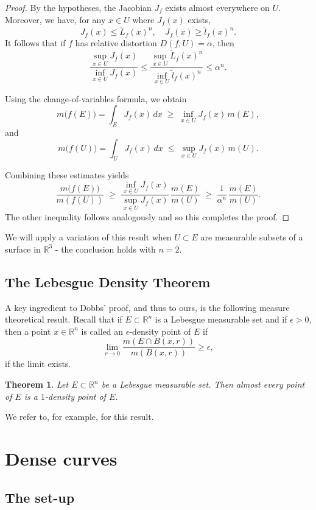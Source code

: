 \documentclass[11pt]{amsart}
\newtheorem{theorem}{Theorem}[section]
\numberwithin{equation}{section}
\theoremstyle{definition}
\theoremstyle{definition}
\theoremstyle{definition}
\newcommand{\R}{\mathbb{R}}
\begin{document}
\begin{proof}
By the hypotheses, the
Jacobian \(J_f\) exists almost everywhere on \(U\).
Moreover, we have, for any $x\in U$ where $J_f(x)$ exists,
\[ J_f(x) \leq \widetilde{L}_f (x) ^n, \quad J_f(x) \geq \widetilde{l}_f(x)^n.\]
It follows that if $f$ has relative distortion $D(f,U) = \alpha$, then
\[
\frac{\sup_{x\in U} J_f(x)}{\inf_{x\in U} J_f(x)} \le \frac{\sup_{x\in U} \widetilde{L}_f(x)^n}{\inf_{x\in U} \widetilde{l}_f(x)^n} \leq \alpha^n .
\]


Using the change-of-variables formula, we obtain
\[
m\bigl(f(E)\bigr)=\int_E J_f(x)\,dx
\;\ge\;
\inf_{x\in U} J_f(x)\, m(E),
\]
and
\[
m\bigl(f(U)\bigr)=\int_U J_f(x)\,dx
\;\le\;
\sup_{x\in U} J_f(x)\, m(U).
\]

Combining these estimates yields
\[
\frac{m\bigl(f(E)\bigr)}{m(f(U))}
\;\ge\;
\frac{\inf_{x\in U} J_f(x)}{\sup_{x\in U} J_f(x)}\,
\frac{m(E)}{m(U)}
\;\ge\;
\frac{1}{\alpha^n}\,
\frac{m(E)}{m(U)}.
\]
The other inequality follows analogously and so this completes the proof.
\end{proof}

We will apply a variation of this result when $U\subset E$ are measurable subsets of a surface in $\R^3$ - the conclusion holds with $n=2$.

\subsection{The Lebesgue Density Theorem}

A key ingredient to Dobbs' proof, and thus to ours, is the following measure theoretical result. Recall that if $E \subset \R^n$ is a Lebesgue measurable set and if $\epsilon >0$, then a point $x\in \R^n$ is called an $\epsilon$-density point of $E$ if 
\[ \lim_{r\to 0} \frac{ m(E \cap B(x,r))}{m(B(x,r))} \geq \epsilon , \]
if the limit exists. 

\begin{theorem}
    \label{thm:ldp}
Let $E\subset \R^n$ be a Lebesgue measurable set. Then almost every point of $E$ is a $1$-density point of $E$.
\end{theorem}

We refer to, for example, \cite[p.45]{EvaGar92} for this result.


\section{Dense curves}
\label{s:dense}

\subsection{The set-up}
\end{document}
